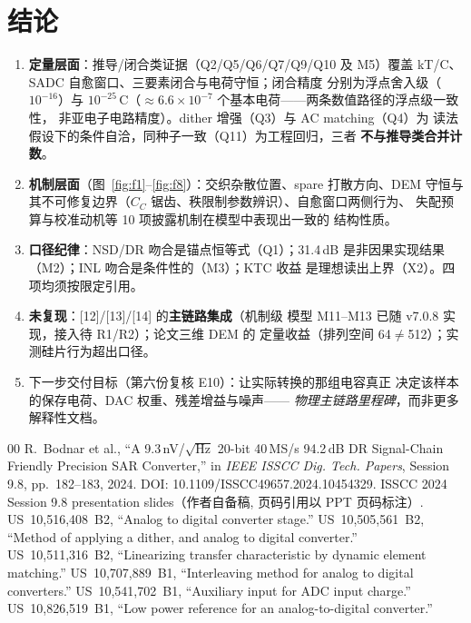 \documentclass[11pt,a4paper,fontset=fandol]{ctexart}
\begin{document}
\FloatBarrier
\section{结论}

\begin{enumerate}[itemsep=2pt]
  \item \textbf{定量层面}：推导/闭合类证据（Q2/Q5/Q6/Q7/Q9/Q10 及
        M5）覆盖 kT/C、SADC 自愈窗口、三要素闭合与电荷守恒；闭合精度
        分别为浮点舍入级（$10^{-16}$）与 $10^{-25}$\,C（$\approx
        6.6\times10^{-7}$ 个基本电荷——两条数值路径的浮点级一致性，
        非亚电子电路精度）。dither 增强（Q3）与 AC matching（Q4）为
        读法假设下的条件自洽，同种子一致（Q11）为工程回归，三者
        \textbf{不与推导类合并计数}。
  \item \textbf{机制层面}（图~\ref{fig:f1}--\ref{fig:f8}）：交织杂散位置、spare 打散方向、DEM 守恒与
        其不可修复边界（$C_C$ 锯齿、秩限制参数辨识）、自愈窗口两侧行为、
        失配预算与校准动机等 10 项披露机制在模型中表现出一致的
        结构性质。
  \item \textbf{口径纪律}：NSD/DR 吻合是锚点恒等式（Q1）；31.4\,dB
        是非因果实现结果（M2）；INL 吻合是条件性的（M3）；KTC 收益
        是理想读出上界（X2）。四项均须按限定引用。
  \item \textbf{未复现}：[12]/[13]/[14] 的\textbf{主链路集成}（机制级
        模型 M11--M13 已随 v7.0.8 实现，接入待 R1/R2）；论文三维 DEM 的
        定量收益（排列空间 64$\neq$512）；实测硅片行为超出口径。
  \item 下一步交付目标（第六份复核 E10）：让实际转换的那组电容真正
        决定该样本的保存电荷、DAC 权重、残差增益与噪声——
        \emph{物理主链路里程碑}，而非更多解释性文档。
\end{enumerate}

\clearpage
\FloatBarrier
\begin{thebibliography}{00}\small
 R.~Bodnar et al., ``A 9.3\,nV/$\sqrt{\mathrm{Hz}}$ 20-bit
  40\,MS/s 94.2\,dB DR Signal-Chain Friendly Precision SAR Converter,''
  in \emph{IEEE ISSCC Dig. Tech. Papers}, Session 9.8, pp.~182--183, 2024.
  DOI: 10.1109/ISSCC49657.2024.10454329.
 ISSCC 2024 Session 9.8 presentation slides（作者自备稿,
  页码引用以 PPT 页码标注）.
 US~10,516,408~B2, ``Analog to digital converter stage.''
 US~10,505,561~B2, ``Method of applying a dither, and
  analog to digital converter.''
 US~10,511,316~B2, ``Linearizing transfer characteristic by
  dynamic element matching.''
 US~10,707,889~B1, ``Interleaving method for analog to
  digital converters.''
 US~10,541,702~B1, ``Auxiliary input for ADC input charge.''
 US~10,826,519~B1, ``Low power reference for an
  analog-to-digital converter.''
\end{thebibliography}
\end{document}
